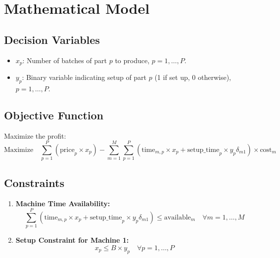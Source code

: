 \documentclass{article}
\begin{document}
\section*{Mathematical Model}

\subsection*{Decision Variables}
\begin{itemize}
    \item \( x_p \): Number of batches of part \( p \) to produce, \( p = 1, \ldots, P \).
    \item \( y_p \): Binary variable indicating setup of part \( p \) (1 if set up, 0 otherwise), \( p = 1, \ldots, P \).
\end{itemize}

\subsection*{Objective Function}
Maximize the profit:
\[
\text{Maximize} \quad \sum_{p=1}^{P} \left( \text{price}_p \times x_p \right) - \sum_{m=1}^{M} \sum_{p=1}^{P} \left( \text{time}_{m,p} \times x_p + \text{setup\_time}_p \times y_p \delta_{m1} \right) \times \text{cost}_m
\]

\subsection*{Constraints}
\begin{enumerate}
    \item \textbf{Machine Time Availability:}
    \[
    \sum_{p=1}^{P} \left( \text{time}_{m,p} \times x_p + \text{setup\_time}_p \times y_p \delta_{m1} \right) \leq \text{available}_m \quad \forall m = 1, \ldots, M
    \]
    \item \textbf{Setup Constraint for Machine 1:}
    \[
    x_p \leq B \times y_p \quad \forall p = 1, \ldots, P
    \]
\end{enumerate}
\end{document}
